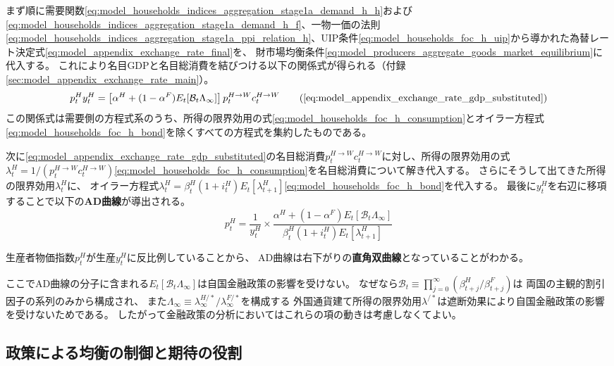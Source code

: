 まず順に需要関数\eqref{eq:model_households_indices_aggregation_stage1a_demand_h_h}および\eqref{eq:model_households_indices_aggregation_stage1a_demand_h_f}、一物一価の法則\eqref{eq:model_households_indices_aggregation_stage1a_ppi_relation_h}、UIP条件\eqref{eq:model_households_foc_h_uip}から導かれた為替レート決定式\eqref{eq:model_appendix_exchange_rate_final}を、
財市場均衡条件\eqref{eq:model_producers_aggregate_goods_market_equilibrium}に代入する。
これにより名目GDPと名目総消費を結びつける以下の関係式が得られる（付録\ref{sec:model_appendix_exchange_rate_main}）。
\begin{equation*}
p_t^Hy_t^H=\left[\alpha^H+(1-\alpha^F)E_t[\mathcal{B}_t\Lambda_{\infty}]\right]p_t^{H\to W}c_t^{H\to W}
\tag{\ref{eq:model_appendix_exchange_rate_gdp_substituted}}
\end{equation*}
この関係式は需要側の方程式系のうち、所得の限界効用の式\eqref{eq:model_households_foc_h_consumption}とオイラー方程式\eqref{eq:model_households_foc_h_bond}を除くすべての方程式を集約したものである。

次に\eqref{eq:model_appendix_exchange_rate_gdp_substituted}の名目総消費\(p_t^{H\to W}c_t^{H\to W}\)に対し、所得の限界効用の式\(\lambda_t^H=1/(p_t^{H\to W}c_t^{H\to W})\)\eqref{eq:model_households_foc_h_consumption}を名目総消費について解き代入する。
さらにそうして出てきた所得の限界効用\(\lambda_t^H\)に、
オイラー方程式\(\lambda_t^H=\beta_t^H(1+i_t^H)E_t[\lambda_{t+1}^H]\)\eqref{eq:model_households_foc_h_bond}を代入する。
最後に\(y_t^H\)を右辺に移項することで以下の\textbf{AD曲線}が導出される。
\begin{equation}
p_t^H=\frac{1}{y_t^H}\times\frac{\alpha^H+(1-\alpha^F)E_t[\mathcal{B}_t\Lambda_{\infty}]}{\beta_t^H(1+i_t^H)E_t[\lambda_{t+1}^H]}
\label{eq:results_asad_ad_curve}
\end{equation}

生産者物価指数\(p_t^H\)が生産\(y_t^H\)に反比例していることから、
AD曲線は右下がりの\textbf{直角双曲線}となっていることがわかる。

ここでAD曲線の分子に含まれる\(E_t[\mathcal{B}_t\Lambda_{\infty}]\)は自国金融政策の影響を受けない。
なぜなら\(\mathcal{B}_t\equiv\prod_{j=0}^{\infty}(\beta_{t+j}^H/\beta_{t+j}^F)\)は
両国の主観的割引因子の系列のみから構成され、
また\(\Lambda_{\infty}\equiv\lambda_{\infty}^{H/*}/\lambda_{\infty}^{F/*}\)を構成する
外国通貨建て所得の限界効用\(\lambda^{/*}\)は遮断効果により自国金融政策の影響を受けないためである。
したがって金融政策の分析においてはこれらの項の動きは考慮しなくてよい。

\subsection{政策による均衡の制御と期待の役割}
\label{sec:results_asad_policy_control}

